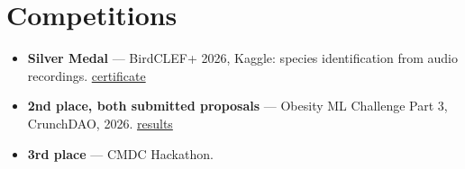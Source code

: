 \documentclass[10pt,letterpaper]{article}
\begin{document}
\section{Competitions}
\begin{itemize}
  \item \textbf{Silver Medal} --- BirdCLEF+ 2026, Kaggle: species identification from audio recordings.
    \hfill{\small\href{https://www.kaggle.com/certification/competitions/salialavi/birdclef-2026}{\color{accent}certificate}}
  \item \textbf{2nd place, both submitted proposals} --- Obesity ML Challenge Part 3, CrunchDAO, 2026.
    \hfill{\small\href{https://www.linkedin.com/pulse/obesity-ml-challenge-part-3-peer-review-results-crunchlabhq-7slec/}{\color{accent}results}}
  \item \textbf{3rd place} --- CMDC Hackathon.
\end{itemize}

\end{document}
